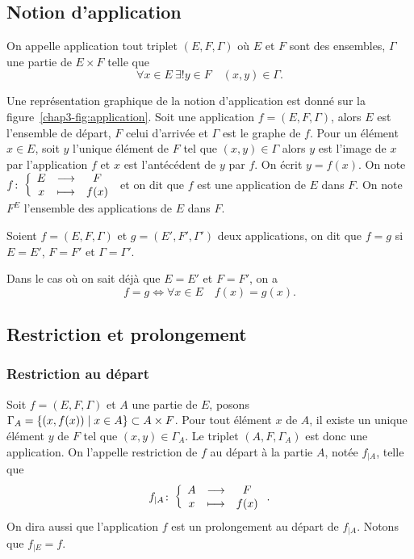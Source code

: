 \subsection{Notion d'application}
\label{chap3-subsec:notiondapplication}
\begin{defdef}
  On appelle application tout triplet \((E, F, \Gamma)\) où \(E\) et \(F\) sont des ensembles, \(\Gamma\) une partie de \(E \times F\) telle que 
  \begin{equation}
    \forall x \in E \ \exists! y \in F \quad (x,y) \in \Gamma.
  \end{equation}
\end{defdef}
Une représentation graphique de la notion d'application est donné sur la figure~\ref{chap3-fig:application}. Soit une
application \(f=(E,F,\Gamma)\), alors \(E\) est l'ensemble de départ, \(F\) celui d'arrivée et \(\Gamma\) est le graphe de \(f\).
Pour un élément \(x \in E\), soit \(y\) l'unique élément de \(F\) tel que \((x,y) \in \Gamma\) alors \(y\) est l'image de \(x\) par
l'application \(f\) et \(x\) est l'antécédent de \(y\) par \(f\). On écrit \(y=f(x)\). On note \(f\colon \left\{\begin{array}{ccc} E & \longrightarrow &F\\ x & \longmapsto & f(x) \end{array} \right.\) et on dit que \(f\) est une application de \(E\) dans \(F\). On note \(F^E\) l'ensemble des applications de \(E\) dans \(F\).
%
\begin{defdef}
  Soient \(f=(E,F,\Gamma)\) et \(g=(E',F',\Gamma')\) deux applications, on dit que \(f=g\) si \(E=E'\), \(F=F'\) et \(\Gamma=\Gamma'\).
\end{defdef}
Dans le cas où on sait déjà que \(E=E'\) et \(F=F'\), on a
\begin{equation}
  f=g \iff \forall x \in E \quad f(x)=g(x).
\end{equation}
%
%
\subsection{Restriction et prolongement}
\label{chap3-restrictionetprolongement}
\subsubsection{Restriction au départ} 
\label{chap3-subsubsec:restrictiondep}
Soit \(f=(E,F,\Gamma)\) et \(A\) une partie de \(E\), posons \(\Gamma_A=\left\{(x,f(x))\mathrel{}\middle|\mathrel{}x \in A\right\} \subset A \times F\). Pour
tout élément \(x\) de \(A\), il existe un unique élément \(y\) de \(F\) tel que \((x,y) \in \Gamma_A\). Le triplet \((A,F, \Gamma_A)\) est donc une application. On l'appelle restriction de \(f\) au départ à la partie \(A\), notée \(f_{|A}\), telle que
\begin{equation}
f_{|A}\colon \left\{\begin{array}{ccc} A & \longrightarrow &F\\ x & \longmapsto & f(x) \end{array} \right..
\end{equation}
On dira aussi que l'application \(f\) est un prolongement au départ de \(f_{|A}\). Notons que \(f_{|E}=f\).
%
